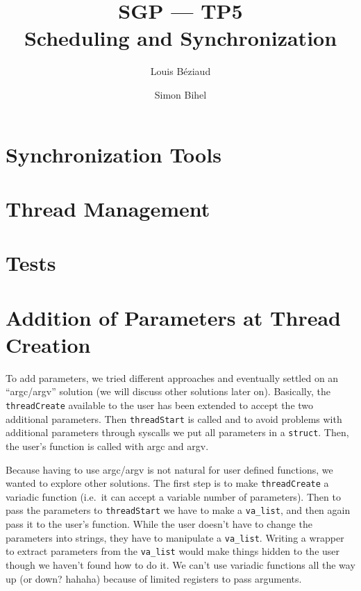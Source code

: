 \documentclass[a4paper,11pt]{article}
\title{SGP --- TP5\\Scheduling and Synchronization}
\author{Louis Béziaud \and Simon Bihel}
\begin{document}
\maketitle

\section{Synchronization Tools}


\section{Thread Management}


\section{Tests}


\section{Addition of Parameters at Thread Creation}
To add parameters, we tried different approaches and eventually settled on an
``argc/argv'' solution (we will discuss other solutions later on). Basically,
the \texttt{threadCreate} available to the user has been extended to accept the
two additional parameters. Then \texttt{threadStart} is called and to avoid
problems with additional parameters through syscalls we put all parameters in a
\texttt{struct}. Then, the user's function is called with argc and argv.

Because having to use argc/argv is not natural for user defined functions, we
wanted to explore other solutions. The first step is to make
\texttt{threadCreate} a variadic function (i.e.\ it can accept a variable number
of parameters). Then to pass the parameters to \texttt{threadStart} we have to
make a \texttt{va\_list}, and then again pass it to the user's function. While
the user doesn't have to change the parameters into strings, they have to
manipulate a \texttt{va\_list}. Writing a wrapper to extract parameters from the
\texttt{va\_list} would make things hidden to the user though we haven't found
how to do it. We can't use variadic functions all the way up (or down? hahaha)
because of limited registers to pass arguments.
\end{document}
